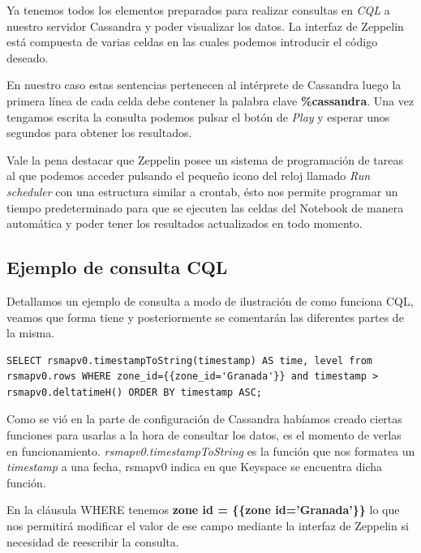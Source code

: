 \newpage

Ya tenemos todos los elementos preparados para realizar consultas en \textit{CQL} a nuestro servidor Cassandra y poder visualizar los datos. La interfaz de Zeppelin está compuesta de varias celdas en las cuales podemos introducir el código deseado.

En nuestro caso estas sentencias pertenecen al intérprete de Cassandra luego la primera línea de cada celda debe contener la palabra clave \textbf{\%cassandra}. Una vez tengamos escrita la consulta podemos pulsar el botón de \textit{Play} y esperar unos segundos para obtener los resultados.

\bigskip

Vale la pena destacar que Zeppelin posee un sistema de programación de tareas al que podemos acceder pulsando el pequeño icono del reloj llamado \textit{Run scheduler} con una estructura similar a crontab, ésto nos permite programar un tiempo predeterminado para que se ejecuten las celdas del Notebook de manera automática y poder tener los resultados actualizados en todo momento.

\subsection{Ejemplo de consulta CQL}

Detallamos un ejemplo de consulta a modo de ilustración de como funciona CQL, veamos que forma tiene y posteriormente se comentarán las diferentes partes de la misma.

\begin{lstlisting}[language=cql,caption={Ejemplo de consulta CQL},label={lst:json_personal}]
%cassandra
SELECT rsmapv0.timestampToString(timestamp) AS time, level from rsmapv0.rows WHERE zone_id={{zone_id='Granada'}} and timestamp > rsmapv0.deltatimeH() ORDER BY timestamp ASC;
\end{lstlisting}

Como se vió en la parte de configuración de Cassandra habíamos creado ciertas funciones para usarlas a la hora de consultar los datos, es el momento de verlas en funcionamiento. \textit{rsmapv0.timestampToString} es la función que nos formatea un \textit{timestamp} a una fecha, rsmapv0 indica en que Keyspace se encuentra dicha función.

En la cláusula WHERE tenemos \textbf{ zone id = \{\{zone id='Granada'\}\}} lo que nos permitirá modificar el valor de ese campo mediante la interfaz de Zeppelin si necesidad de reescribir la consulta.

